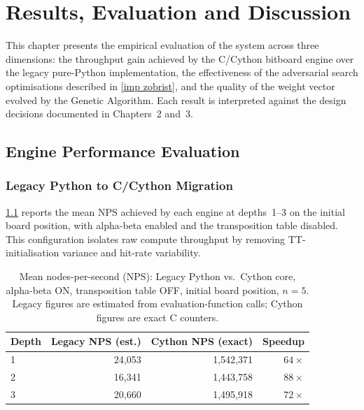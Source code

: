 
\chapter{Results, Evaluation and Discussion}
\label{chapter4}

This chapter presents the empirical evaluation of the system across three dimensions: the
throughput gain achieved by the C/Cython bitboard engine over the legacy pure-Python
implementation, the effectiveness of the adversarial search optimisations described in
\cref{imp zobrist}, and the quality of the weight vector evolved by the Genetic
Algorithm. Each result is interpreted against the design decisions documented in
Chapters~2 and~3.

\section{Engine Performance Evaluation}
\label{sec:engine_perf}

\subsection{Legacy Python to C/Cython Migration}
\label{sec:engine_migration}

\cref{tab:nps_comparison} reports the mean NPS achieved by each engine at
depths~1--3 on the initial board position, with alpha-beta enabled and the transposition
table disabled. This configuration isolates raw compute throughput by removing
TT-initialisation variance and hit-rate variability.

\begin{table}[ht]
  \centering
  \caption{Mean nodes-per-second (NPS): Legacy Python vs.\ Cython core, alpha-beta ON, transposition table OFF, initial board position, $n = 5$.
    Legacy figures are estimated from evaluation-function calls; Cython figures are exact C
    counters.}
  \label{tab:nps_comparison}
  \begin{tabular}{lrrr}
    \hline
    \textbf{Depth} & \textbf{Legacy NPS (est.)} & \textbf{Cython NPS (exact)} & \textbf{Speedup} \\
    \hline
    1              & 24{,}053                   & 1{,}542{,}371               & $64\times$       \\
    2              & 16{,}341                   & 1{,}443{,}758               & $88\times$       \\
    3              & 20{,}660                   & 1{,}495{,}918               & $72\times$       \\
    \hline
  \end{tabular}
\end{table}

